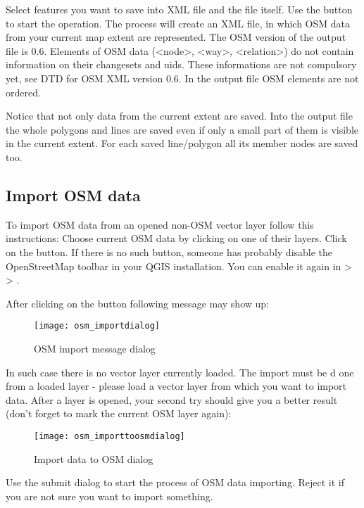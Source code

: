 Select features you want to save into XML file and the file itself. Use 
the  button to start the operation. The process will create an 
XML file, in which OSM data from your current map extent are represented. 
The OSM version of the output file is 0.6. Elements of OSM data 
(<node>, <way>, <relation>) do not contain information on their changesets 
and uids. These informations are not compulsory yet, see DTD for
OSM XML version 0.6. In the output file OSM elements are not ordered.

Notice that not only data from the current extent are saved. Into the output 
file the whole polygons and lines are saved even if only a small part of them 
is visible in the current extent. For each saved line/polygon all its member 
nodes are saved too.

\subsection{Import OSM data}  

To import OSM data from an opened non-OSM vector layer follow this 
instructions: Choose current OSM data by clicking on one of their layers. 
Click on the  button. If 
there is no such button, someone has probably disable the OpenStreetMap 
toolbar in your QGIS installation. You can enable it again in 
 >  > . 

After clicking on the button following message may show up:

\begin{figure}[ht]
   \centering
   \caption{OSM import message dialog \nixcaption}\label{fig:osmimportmessage}\smallskip
   \texttt{[image: osm\_importdialog]}
\end{figure}

In such case there is no vector layer currently loaded. The import must be d
one from a loaded layer - please load a vector layer from which you want to 
import data. After a layer is opened, your second try should give you a 
better result (don't forget to mark the current OSM layer again):

\begin{figure}[ht]
   \centering
   \caption{Import data to OSM dialog \nixcaption}\label{fig:osmimporttoosm}\smallskip
   \texttt{[image: osm\_importtoosmdialog]}
\end{figure}

Use the submit dialog to start the process of OSM data importing.
Reject it if you are not sure you want to import something.
